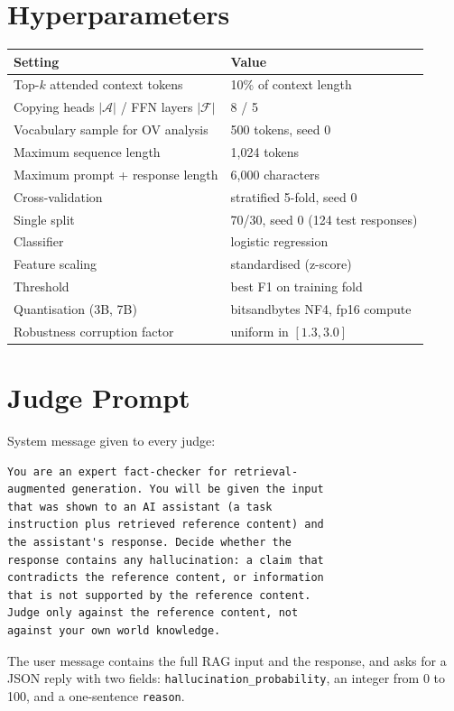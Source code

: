 \documentclass[conference]{IEEEtran}
\begin{document}
\appendices
\section{Hyperparameters}
\label{app:hyper}
\begin{table}[h]
\centering\footnotesize
\begin{tabular}{@{}ll@{}}
\toprule
Setting & Value \\
\midrule
Top-$k$ attended context tokens & 10\% of context length \\
Copying heads $|\mathcal{A}|$ / FFN layers $|\mathcal{F}|$ & 8 / 5 \\
Vocabulary sample for OV analysis & 500 tokens, seed 0 \\
Maximum sequence length & 1{,}024 tokens \\
Maximum prompt + response length & 6{,}000 characters \\
Cross-validation & stratified 5-fold, seed 0 \\
Single split & 70/30, seed 0 (124 test responses) \\
Classifier & logistic regression \\
Feature scaling & standardised (z-score) \\
Threshold & best F1 on training fold \\
Quantisation (3B, 7B) & bitsandbytes NF4, fp16 compute \\
Robustness corruption factor & uniform in $[1.3, 3.0]$ \\
\bottomrule
\end{tabular}
\end{table}

\section{Judge Prompt}
\label{app:prompt}
System message given to every judge:
\begin{footnotesize}
\begin{verbatim}
You are an expert fact-checker for retrieval-
augmented generation. You will be given the input
that was shown to an AI assistant (a task
instruction plus retrieved reference content) and
the assistant's response. Decide whether the
response contains any hallucination: a claim that
contradicts the reference content, or information
that is not supported by the reference content.
Judge only against the reference content, not
against your own world knowledge.
\end{verbatim}
\end{footnotesize}
The user message contains the full RAG input and the response, and asks for a JSON reply with two fields: \texttt{hallucination\_probability}, an integer from 0 to 100, and a one-sentence \texttt{reason}.
\end{document}
